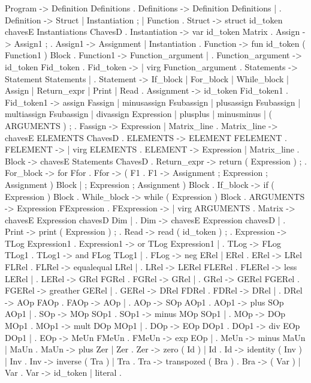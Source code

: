 Program -> Definition Definitions .
Definitions -> Definition Definitions | .
Definition -> Struct | Instantiation ; | Function .
Struct -> struct id_token chavesE Instantiations ChavesD .
Instantiation -> var id_token Matrix .
Assign -> Assign1 ; .
Assign1 -> Assignment | Instantiation .
Function -> fun id_token ( Function1 ) Block .
Function1 -> Function_argument | .
Function_argument -> id_token Fid_token .
Fid_token -> | virg Function_argument .
Statements -> Statement Statements | .
Statement -> If_block | For_block | While_block | Assign | Return_expr | Print | Read .
Assignment -> id_token Fid_token1 .
Fid_token1 -> assign Fassign | minusassign Fsubassign | plusassign Fsubassign | multiassign Fsubassign | divassign Expression | plusplus | minusminus | ( ARGUMENTS ) ; .
Fassign -> Expression | Matrix_line .
Matrix_line -> chavesE ELEMENTS ChavesD .
ELEMENTS -> ELEMENT FELEMENT .
FELEMENT -> | virg ELEMENTS .
ELEMENT -> Expression | Matrix_line .
Block -> chavesE Statements ChavesD .
Return_expr -> return ( Expression ) ; .
For_block -> for Ffor .
Ffor -> ( F1 .
F1 -> Assignment ; Expression ; Assignment ) Block | ; Expression ; Assignment ) Block .
If_block -> if ( Expression ) Block .
While_block -> while ( Expression ) Block .
ARGUMENTS -> Expression FExpression .
FExpression -> | virg ARGUMENTS .
Matrix -> chavesE Expression chavesD Dim | .
Dim -> chavesE Expression chavesD | .
Print -> print ( Expression ) ; .
Read -> read ( id_token ) ; .
Expression -> TLog Expression1 .
Expression1 -> or TLog Expression1 | .
TLog -> FLog TLog1 .
TLog1 -> and FLog TLog1 | .
FLog -> neg ERel | ERel .
ERel -> LRel FLRel .
FLRel -> equalequal LRel | .
LRel -> LERel FLERel .
FLERel -> less LERel | .
LERel -> GRel FGRel .
FGRel -> \leq GRel | .
GRel -> GERel FGERel .
FGERel -> greather GERel | .
GERel -> DRel FDRel .
FDRel -> \geq DRel | .
DRel -> AOp FAOp .
FAOp -> \neq AOp | .
AOp -> SOp AOp1 .
AOp1 -> plus SOp AOp1 | .
SOp -> MOp SOp1 .
SOp1 -> minus MOp SOp1 | .
MOp -> DOp MOp1 .
MOp1 -> mult DOp MOp1 | .
DOp -> EOp DOp1 .
DOp1 -> div EOp DOp1 | .
EOp -> MeUn FMeUn .
FMeUn -> exp EOp | .
MeUn -> minus MaUn | MaUn .
MaUn -> plus Zer | Zer .
Zer -> zero ( Id ) | Id .
Id -> identity ( Inv ) | Inv .
Inv -> inverse ( Tra ) | Tra .
Tra -> transpozed ( Bra ) .
Bra -> ( Var ) | Var .
Var -> id_token | literal .